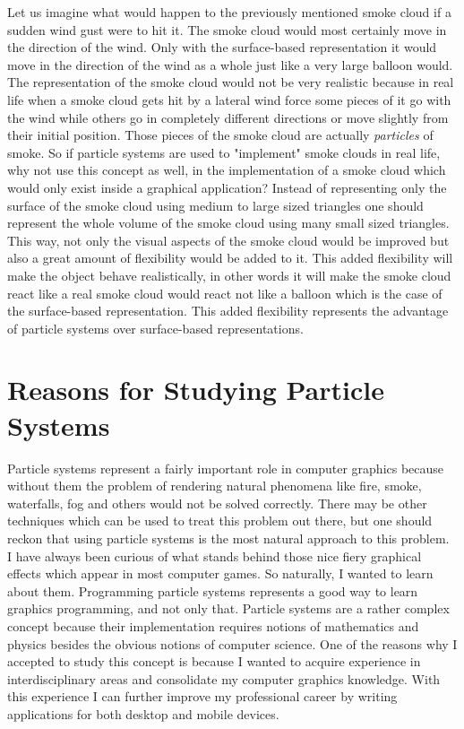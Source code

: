 Let us imagine what would happen to the previously mentioned smoke cloud if a sudden wind gust were to hit it. The smoke cloud would most certainly move in the direction of the wind. Only with the surface-based representation it would move in the direction of the wind as a whole just like a very large balloon would. The representation of the smoke cloud would not be very realistic because in real life when a smoke cloud gets hit by a lateral wind force some pieces of it go with the wind while others go in completely different directions or move slightly from their initial position. Those pieces of the smoke cloud are actually \textit{particles} of smoke. So if particle systems are used to "implement" smoke clouds in real life, why not use this concept as well, in the implementation of a smoke cloud which would only exist inside a graphical application? Instead of representing only the surface of the smoke cloud using medium to large sized triangles one should represent the whole volume of the smoke cloud using many small sized triangles. This way, not only the visual aspects of the smoke cloud would be improved but also a great amount of flexibility would be added to it. This added flexibility will make the object behave realistically, in other words it will make the smoke cloud react like a real smoke cloud would react not like a balloon which is the case of the surface-based representation. This added flexibility represents the advantage of particle systems over surface-based representations.\\
\newpage
\section{Reasons for Studying Particle Systems}
Particle systems represent a fairly important role in computer graphics because without them the problem of rendering natural phenomena like fire, smoke, waterfalls, fog and others would not be solved correctly. There may be other techniques which can be used to treat this problem out there, but one should reckon that using particle systems is the most natural approach to this problem.\\

I have always been curious of what stands behind those nice fiery graphical effects which appear in most computer games. So naturally, I wanted to learn about them. Programming particle systems represents a good way to learn graphics programming, and not only that. Particle systems are a rather complex concept because their implementation requires notions of mathematics and physics besides the obvious notions of computer science. One of the reasons why I accepted to study this concept is because I wanted to acquire experience in interdisciplinary areas and consolidate my computer graphics knowledge. With this experience I can further improve my professional career by writing applications for both desktop and mobile devices.\\


